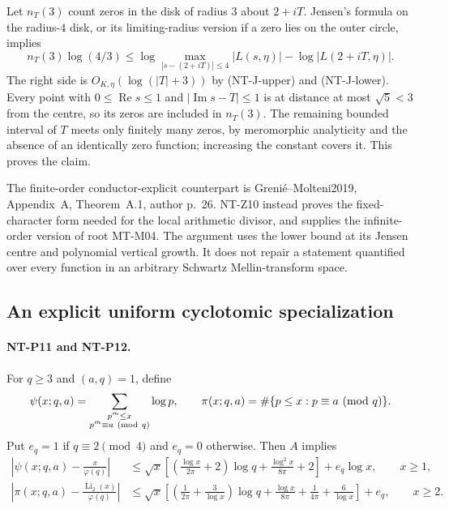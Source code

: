 Let $n_T(3)$ count zeros in the disk of radius $3$ about $2+iT$.
Jensen's formula on the radius-$4$ disk, or its limiting-radius version
if a zero lies on the outer circle, implies
\[
 n_T(3)\log(4/3)
 \le\log\max_{|s-(2+iT)|\le4}|L(s,\eta)|
                -\log|L(2+iT,\eta)|.
\]
The right side is $O_{K,\eta}(\log(|T|+3))$ by (NT-J-upper) and
(NT-J-lower).  Every point with $0\le\operatorname{Re}s\le1$ and
$|\operatorname{Im}s-T|\le1$ is at distance at most $\sqrt5<3$
from the centre, so its zeros are included in $n_T(3)$.  The remaining
bounded interval of $T$ meets only finitely many zeros, by meromorphic
analyticity and the absence of an identically zero function; increasing
the constant covers it.  This proves the claim.

The finite-order conductor-explicit counterpart is
Greni\'e--Molteni2019, Appendix~A, Theorem~A.1, author p.~26.
NT-Z10 instead proves the fixed-character form needed for the local
arithmetic divisor, and supplies the infinite-order version of root
MT-M04.  The argument uses the lower bound at its Jensen centre and
polynomial vertical growth.  It does not repair a statement quantified
over every function in an arbitrary Schwartz Mellin-transform space.

\subsection{An explicit uniform cyclotomic specialization}

\paragraph{NT-P11 and NT-P12.}
For $q\ge3$ and $(a,q)=1$, define
\[
 \psi(x;q,a)=\sum_{\substack{p^m\le x\\p^m\equiv a\ ({\rm mod}\ q)}}\log p,
 \qquad
 \pi(x;q,a)=\#\{p\le x:p\equiv a\ ({\rm mod}\ q)\}.
\]
Put $e_q=1$ if $q\equiv2\pmod4$ and $e_q=0$ otherwise.
Then $A$ implies
\begin{align*}
 \left|\psi(x;q,a)-\frac{x}{\varphi(q)}\right|
 &\le\sqrt{x}\left[
 \left(\frac{\log x}{2\pi}+2\right)\log q+
 \frac{\log^2x}{8\pi}+2\right]+e_q\log x,\qquad x\ge1,\\
 \left|\pi(x;q,a)-\frac{\operatorname{Li}_2(x)}{\varphi(q)}\right|
 &\le\sqrt{x}\left[
 \left(\frac1{2\pi}+\frac3{\log x}\right)\log q+
 \frac{\log x}{8\pi}+\frac1{4\pi}+\frac6{\log x}\right]+e_q,
 \qquad x\ge2.
\end{align*}

